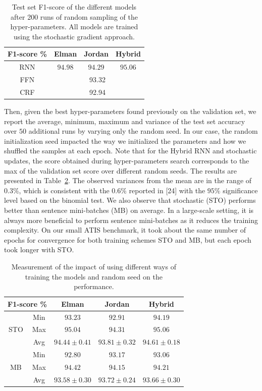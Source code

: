 \begin{table}
\centering
\begin{tabular}{|c|c|c|c|}
\hline
F1-score \% &  Elman  & Jordan & Hybrid \\
\hline
RNN & $94.98$ &   $94.29$ &   $95.06$ \\
\hline
FFN & \multicolumn{3}{c|}{93.32} \\
CRF & \multicolumn{3}{c|}{92.94} \\
\hline
\end{tabular}
\caption{Test set F1-score of the different models after 200 runs of random
sampling of the hyper-parameters. All models are trained using the stochastic
gradient approach.}
\label{tab:f1}
\end{table}

Then, given the best hyper-parameters found previously on the validation set,
we report the average, minimum, maximum and variance of the test set accuracy
over $50$ additional runs by varying only the random seed. In our case, the
random initialization seed impacted the way we initialized the parameters and
how we shuffled the samples at each epoch. Note that for the Hybrid RNN and
stochastic updates, the score obtained during hyper-parameters search
corresponds to the max of the validation set score over different random seeds.
The results are presented in Table~\ref{tab:seed}. The observed variances from the mean are
in the range of $0.3\%$, which is consistent with the $0.6\%$ reported in [24] with
the $95\%$ significance level based on the binomial test. We also observe that
stochastic (STO) performs better than sentence mini-batches (MB) on average. In
a large-scale setting, it is always more beneficial to perform sentence
mini-batches as it reduces the training complexity. On our small ATIS
benchmark, it took about the same number of epochs for convergence for both
training schemes STO and MB, but each epoch took longer with STO.

\begin{table}
\centering
\begin{tabular}{|c|c|c|c|c|}
\hline
\multicolumn{2}{|c|}{F1-score \%} &  Elman &  Jordan & Hybrid \\
\hline
\multirow{3}{*}{STO} & Min & $93.23$ &  $92.91$ &   $94.19$ \\
 &   Max &  $95.04$  &  $94.31$  & $95.06$ \\
        & Avg & $94.44 \pm 0.41$ &  $93.81 \pm0.32$ &  $94.61 \pm0.18$ \\
\hline
\multirow{3}{*}{MB} & Min & $92.80$ &  $93.17$ &   $93.06$ \\
 &   Max &  $94.42$  &  $94.15$  & $94.21$ \\
        & Avg & $93.58 \pm 0.30$ &  $93.72 \pm0.24$ &  $93.66 \pm0.30$ \\
\hline
\end{tabular}
\caption{Measurement of the impact of using different ways of training the models and random seed on the performance.}
\label{tab:seed}
\end{table}
                
